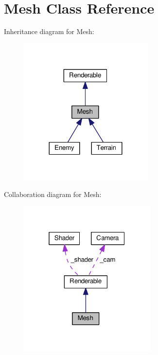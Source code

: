 \hypertarget{class_mesh}{}\section{Mesh Class Reference}
\label{class_mesh}


Inheritance diagram for Mesh\+:\nopagebreak
\begin{figure}[H]
\begin{center}
\leavevmode
\includegraphics[width=192pt]{class_mesh__inherit__graph}
\end{center}
\end{figure}


Collaboration diagram for Mesh\+:\nopagebreak
\begin{figure}[H]
\begin{center}
\leavevmode
\includegraphics[width=196pt]{class_mesh__coll__graph}
\end{center}
\end{figure}
